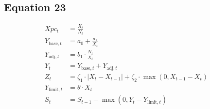 \documentclass[12pt]{article}
\begin{document}
\subsection*{Equation 23}
\begin{align}
Xpc_t &= \frac{X_t}{N_t} \\
  Y_{\text{base},t} &= a_0 + \frac{a_1}{X_t} \\
  Y_{\text{adj},t} &= b_1 \cdot \frac{N_t}{X_t} \\
  Y_t &= Y_{\text{base},t} + Y_{\text{adj},t} \\
  Z_t &= \zeta_1 \cdot |X_t - X_{t-1}| + \zeta_2 \cdot \max(0, X_{t-1} - X_t) \\
  Y_{\text{limit},t} &= \theta \cdot X_t \\
  S_t &= S_{t-1} + \max(0, Y_t - Y_{\text{limit},t})
\end{align}
\end{document}
